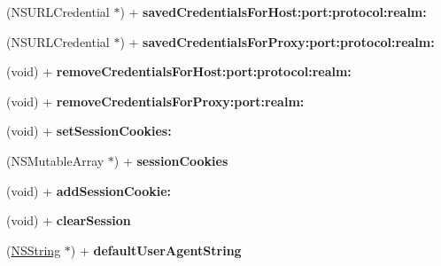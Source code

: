 \begin{DoxyCompactItemize}
\item 
\hypertarget{interface_a_s_i_h_t_t_p_request_a443ec6e082e2b1ab9d7568d6875068c7}{
(\-N\-S\-U\-R\-L\-Credential $\ast$) + {\bfseries saved\-Credentials\-For\-Host\-:port\-:protocol\-:realm\-:}}
\label{interface_a_s_i_h_t_t_p_request_a443ec6e082e2b1ab9d7568d6875068c7}

\item 
\hypertarget{interface_a_s_i_h_t_t_p_request_a9a85cf244d073467d56e328d83760f2d}{
(\-N\-S\-U\-R\-L\-Credential $\ast$) + {\bfseries saved\-Credentials\-For\-Proxy\-:port\-:protocol\-:realm\-:}}
\label{interface_a_s_i_h_t_t_p_request_a9a85cf244d073467d56e328d83760f2d}

\item 
\hypertarget{interface_a_s_i_h_t_t_p_request_a5280dcb803450e7187587972ce540652}{
(void) + {\bfseries remove\-Credentials\-For\-Host\-:port\-:protocol\-:realm\-:}}
\label{interface_a_s_i_h_t_t_p_request_a5280dcb803450e7187587972ce540652}

\item 
\hypertarget{interface_a_s_i_h_t_t_p_request_a213e5645cbf90459d6e7b987d24ddd33}{
(void) + {\bfseries remove\-Credentials\-For\-Proxy\-:port\-:realm\-:}}
\label{interface_a_s_i_h_t_t_p_request_a213e5645cbf90459d6e7b987d24ddd33}

\item 
\hypertarget{interface_a_s_i_h_t_t_p_request_aa1a0ecf9217c99bd0d252c0ff473ab22}{
(void) + {\bfseries set\-Session\-Cookies\-:}}
\label{interface_a_s_i_h_t_t_p_request_aa1a0ecf9217c99bd0d252c0ff473ab22}

\item 
\hypertarget{interface_a_s_i_h_t_t_p_request_a5995ee20ada072e51da56a940e0b0f28}{
(\-N\-S\-Mutable\-Array $\ast$) + {\bfseries session\-Cookies}}
\label{interface_a_s_i_h_t_t_p_request_a5995ee20ada072e51da56a940e0b0f28}

\item 
\hypertarget{interface_a_s_i_h_t_t_p_request_a9a6621daa1c2571d9d1cc0d46f912e56}{
(void) + {\bfseries add\-Session\-Cookie\-:}}
\label{interface_a_s_i_h_t_t_p_request_a9a6621daa1c2571d9d1cc0d46f912e56}

\item 
\hypertarget{interface_a_s_i_h_t_t_p_request_a85b93e4b30cdf106e45ee1b8d3a28f3d}{
(void) + {\bfseries clear\-Session}}
\label{interface_a_s_i_h_t_t_p_request_a85b93e4b30cdf106e45ee1b8d3a28f3d}

\item 
\hypertarget{interface_a_s_i_h_t_t_p_request_adde353be686c11a87e7c2bb1f3b66fea}{
(\hyperlink{class_n_s_string}{\-N\-S\-String} $\ast$) + {\bfseries default\-User\-Agent\-String}}
\label{interface_a_s_i_h_t_t_p_request_adde353be686c11a87e7c2bb1f3b66fea}


\end{DoxyCompactItemize}
